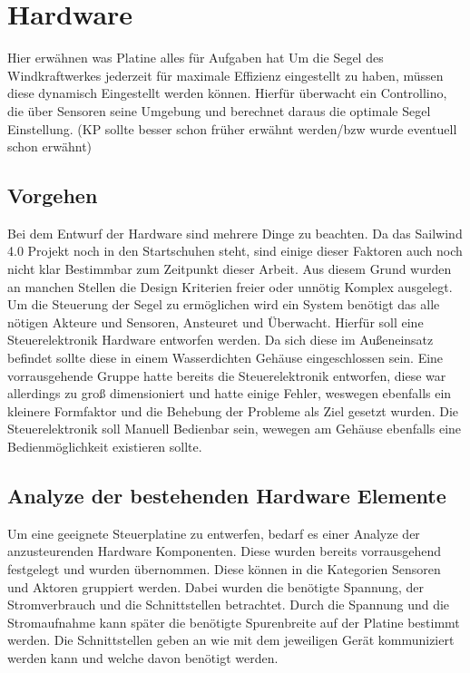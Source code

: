 \section{Hardware}
Hier erwähnen was Platine alles für Aufgaben hat
Um die Segel des Windkraftwerkes jederzeit für maximale Effizienz eingestellt zu haben, müssen diese dynamisch Eingestellt werden können. Hierfür überwacht ein Controllino, die über Sensoren seine Umgebung und berechnet daraus die optimale Segel Einstellung. (KP sollte besser schon früher erwähnt werden/bzw wurde eventuell schon erwähnt)
\subsection{Vorgehen}
Bei dem Entwurf der Hardware sind mehrere Dinge zu beachten. Da das Sailwind 4.0 Projekt noch in den Startschuhen steht, sind einige dieser Faktoren auch noch nicht klar Bestimmbar zum Zeitpunkt dieser Arbeit. Aus diesem Grund wurden an manchen Stellen die Design Kriterien freier oder unnötig Komplex ausgelegt.\\

Um die Steuerung der Segel zu ermöglichen wird ein System benötigt das alle nötigen Akteure und Sensoren, Ansteuret und Überwacht. Hierfür soll eine Steuerelektronik Hardware entworfen werden. Da sich diese im Außeneinsatz befindet sollte diese in einem Wasserdichten Gehäuse eingeschlossen sein. Eine vorrausgehende Gruppe hatte bereits die Steuerelektronik entworfen, diese war allerdings zu groß dimensioniert und hatte einige Fehler, weswegen ebenfalls ein kleinere Formfaktor und die Behebung der Probleme als Ziel gesetzt wurden. Die Steuerelektronik soll Manuell Bedienbar sein, wewegen am Gehäuse ebenfalls eine Bedienmöglichkeit existieren sollte.


\label{Analyze_der_Aktoren_und_Sensoren}
\subsection{Analyze der bestehenden Hardware Elemente}
Um eine geeignete Steuerplatine zu entwerfen, bedarf es einer Analyze der anzusteurenden Hardware Komponenten. Diese wurden bereits vorrausgehend festgelegt und wurden übernommen. Diese können in die Kategorien Sensoren und Aktoren gruppiert werden. Dabei wurden die benötigte Spannung, der Stromverbrauch und die Schnittstellen betrachtet. Durch die Spannung und die Stromaufnahme kann später die benötigte Spurenbreite auf der Platine bestimmt werden. Die Schnittstellen geben an wie mit dem jeweiligen Gerät kommuniziert werden kann und welche davon benötigt werden.\\

